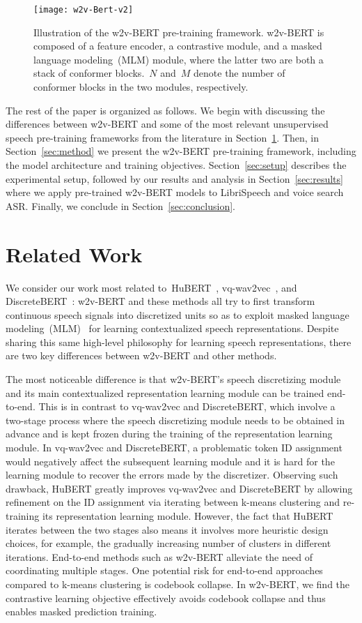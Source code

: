 \documentclass{article}
\begin{document}
\begin{figure}[htbp]
  \centering
  \texttt{[image: w2v-Bert-v2]}
  \caption{Illustration of the w2v-BERT pre-training framework. w2v-BERT is composed of a feature encoder, a contrastive module, and a masked language modeling~(MLM) module, where the latter two are both a stack of conformer blocks.~$N$ and~$M$ denote the number of conformer blocks in the two modules, respectively.}
  \label{fig:model}
\end{figure}

The rest of the paper is organized as follows.
We begin with discussing the differences between w2v-BERT and some of the most relevant unsupervised speech pre-training frameworks from the literature in Section~\ref{sec:related}.
Then, in Section~\ref{sec:method} we present the w2v-BERT pre-training framework, including the model architecture and training objectives.
Section~\ref{sec:setup} describes the experimental setup, followed by our results and analysis in Section~\ref{sec:results} where we apply pre-trained w2v-BERT models to LibriSpeech and voice search ASR.
Finally, we conclude in Section~\ref{sec:conclusion}.


\section{Related Work}
\label{sec:related}
We consider our work most related to~HuBERT~\cite{hsu2021hubert}, vq-wav2vec~\cite{baevski2020vq}, and DiscreteBERT~\cite{baevski2019effectiveness}: w2v-BERT and these methods all try to first transform continuous speech signals into discretized units so as to exploit masked language modeling~(MLM)~\cite{devlin2019bert} for learning contextualized speech representations.
Despite sharing this same high-level philosophy for learning speech representations, there are two key differences between w2v-BERT and other methods.

The most noticeable difference is that w2v-BERT's speech discretizing module and its main contextualized representation learning module can be trained end-to-end.
This is in contrast to vq-wav2vec and DiscreteBERT, which involve a two-stage process where the speech discretizing module needs to be obtained in advance and is kept frozen during the training of the representation learning module.
In vq-wav2vec and DiscreteBERT, a problematic token ID assignment would negatively affect the subsequent learning module and it is hard for the learning module to recover the errors made by the discretizer.
Observing such drawback, HuBERT greatly improves vq-wav2vec and DiscreteBERT by allowing refinement on the ID assignment via iterating between k-means clustering and re-training its representation learning module. 
However, the fact that HuBERT iterates between the two stages also means it involves more heuristic design choices, for example, the gradually increasing number of clusters in different iterations.
End-to-end methods such as w2v-BERT alleviate the need of coordinating multiple stages.
One potential risk for end-to-end approaches compared to k-means clustering is codebook collapse.
In w2v-BERT, we find the contrastive learning objective effectively avoids codebook collapse and thus enables masked prediction training.
\end{document}

